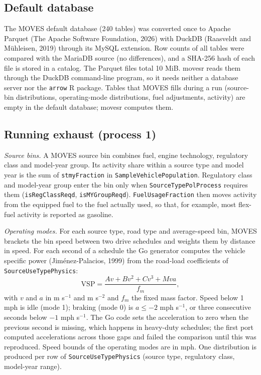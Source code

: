 \documentclass[preprint,
3p]{elsarticle} %
\begin{document}
\subsection{Default database}\label{default-database}

The MOVES default database (240 tables) was converted once to Apache
Parquet (The Apache Software Foundation, 2026) with DuckDB (Raasveldt
and Mühleisen, 2019) through its MySQL extension. Row counts of all
tables were compared with the MariaDB source (no differences), and a
SHA-256 hash of each file is stored in a catalog. The Parquet files
total 10 MiB. movesr reads them through the DuckDB command-line program,
so it needs neither a database server nor the \texttt{arrow} R package.
Tables that MOVES fills during a run (source-bin distributions,
operating-mode distributions, fuel adjustments, activity) are empty in
the default database; movesr computes them.

\subsection{Running exhaust (process
1)}\label{running-exhaust-process-1}

\emph{Source bins.} A MOVES source bin combines fuel, engine technology,
regulatory class and model-year group. Its activity share within a
source type and model year is the sum of \texttt{stmyFraction} in
\texttt{SampleVehiclePopulation}. Regulatory class and model-year group
enter the bin only when \texttt{SourceTypePolProcess} requires them
(\texttt{isRegClassReqd}, \texttt{isMYGroupReqd}).
\texttt{FuelUsageFraction} then moves activity from the equipped fuel to
the fuel actually used, so that, for example, most flex-fuel activity is
reported as gasoline.

\emph{Operating modes.} For each source type, road type and
average-speed bin, MOVES brackets the bin speed between two drive
schedules and weights them by distance in speed. For each second of a
schedule the Go generator computes the vehicle specific power
(Jiménez-Palacios, 1999) from the road-load coefficients of
\texttt{SourceUseTypePhysics}: \begin{equation}
\mathrm{VSP} = \frac{A v + B v^2 + C v^3 + M v a}{f_m},
\end{equation} with \(v\) and \(a\) in m s\(^{-1}\) and m s\(^{-2}\) and
\(f_m\) the fixed mass factor. Speed below 1 mph is idle (mode 1);
braking (mode 0) is \(a \le -2\) mph s\(^{-1}\), or three consecutive
seconds below \(-1\) mph s\(^{-1}\). The Go code sets the acceleration
to zero when the previous second is missing, which happens in heavy-duty
schedules; the first port computed accelerations across those gaps and
failed the comparison until this was reproduced. Speed bounds of the
operating modes are in mph. One distribution is produced per row of
\texttt{SourceUseTypePhysics} (source type, regulatory class, model-year
range).
\end{document}
